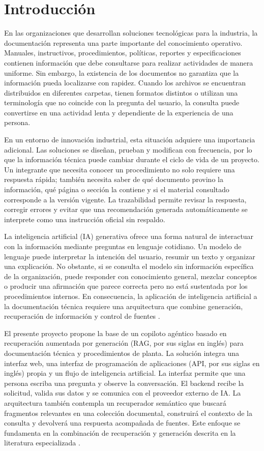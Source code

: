 \section{Introducción}

En las organizaciones que desarrollan soluciones tecnológicas para la industria, la documentación representa una parte importante del conocimiento operativo. Manuales, instructivos, procedimientos, políticas, reportes y especificaciones contienen información que debe consultarse para realizar actividades de manera uniforme. Sin embargo, la existencia de los documentos no garantiza que la información pueda localizarse con rapidez. Cuando los archivos se encuentran distribuidos en diferentes carpetas, tienen formatos distintos o utilizan una terminología que no coincide con la pregunta del usuario, la consulta puede convertirse en una actividad lenta y dependiente de la experiencia de una persona.

En un entorno de innovación industrial, esta situación adquiere una importancia adicional. Las soluciones se diseñan, prueban y modifican con frecuencia, por lo que la información técnica puede cambiar durante el ciclo de vida de un proyecto. Un integrante que necesita conocer un procedimiento no solo requiere una respuesta rápida; también necesita saber de qué documento provino la información, qué página o sección la contiene y si el material consultado corresponde a la versión vigente. La trazabilidad permite revisar la respuesta, corregir errores y evitar que una recomendación generada automáticamente se interprete como una instrucción oficial sin respaldo.

La inteligencia artificial (IA) generativa ofrece una forma natural de interactuar con la información mediante preguntas en lenguaje cotidiano. Un modelo de lenguaje puede interpretar la intención del usuario, resumir un texto y organizar una explicación. No obstante, si se consulta el modelo sin información específica de la organización, puede responder con conocimiento general, mezclar conceptos o producir una afirmación que parece correcta pero no está sustentada por los procedimientos internos. En consecuencia, la aplicación de inteligencia artificial a la documentación técnica requiere una arquitectura que combine generación, recuperación de información y control de fuentes \citep{lewis2020rag,gao2023rag}.

El presente proyecto propone la base de un copiloto agéntico basado en recuperación aumentada por generación (RAG, por sus siglas en inglés) para documentación técnica y procedimientos de planta. La solución integra una interfaz web, una interfaz de programación de aplicaciones (API, por sus siglas en inglés) propia y un flujo de inteligencia artificial. La interfaz permite que una persona escriba una pregunta y observe la conversación. El backend recibe la solicitud, valida sus datos y se comunica con el proveedor externo de IA. La arquitectura también contempla un recuperador semántico que buscará fragmentos relevantes en una colección documental, construirá el contexto de la consulta y devolverá una respuesta acompañada de fuentes. Este enfoque se fundamenta en la combinación de recuperación y generación descrita en la literatura especializada \citep{lewis2020rag,gao2023rag}.

